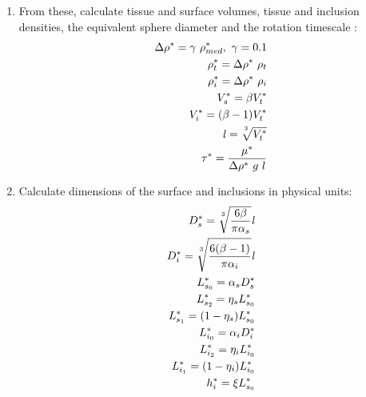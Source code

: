 \documentclass[10pt,a4paper]{article}
\def\non{\nonumber}
\def\l{\mathit{l}}
\begin{document}
\begin{enumerate}
	\item From these, calculate tissue and surface volumes, tissue and inclusion densities, the equivalent sphere diameter and the rotation timescale :
\begin{eqnarray}\label{nd2dpars3}
	\Delta \rho^* = \gamma ~ \rho_{med}^*, ~ \gamma = 0.1 \non \\
	\rho^*_t = \Delta \rho^* ~ \rho_t \non \\
	\rho^*_i = \Delta \rho^* ~ \rho_i \non \\
	V_s^* = \beta V_t^* \non \\
	V_i^* = (\beta-1) V_t^* \non \\
	\l = \sqrt[\uproot{5}3]{V_t^*} \non \\
	\tau^* = \frac{\mu^*}{\Delta \rho^* ~ g ~ l}
\end{eqnarray}
\item Calculate dimensions of the surface and inclusions in physical units:
\begin{eqnarray}\label{nd2dpars4}
	D_s^* = \sqrt[\uproot{5}3]{\frac{6 \beta}{\pi \alpha_s}} \l \non \\
	D^*_i = \sqrt[\uproot{5}3]{\frac{6 (\beta-1)}{\pi \alpha_i}} \l \non \\
	L^*_{s_0} = \alpha_s D^*_s \non \\
	L^*_{s_2} = \eta_s L^*_{s_0} \non \\
	L^*_{s_1} = (1-\eta_s) L^*_{s_0} \non \\
	L^*_{i_0} = \alpha_i D^*_i \non \\
	L^*_{i_2} = \eta_i L^*_{i_0} \non \\
	L^*_{i_1} = (1-\eta_i) L^*_{i_0} \non \\
	h^*_i = \xi L^*_{s_0}  \non \\
\end{eqnarray}

\end{enumerate}
\end{document}
